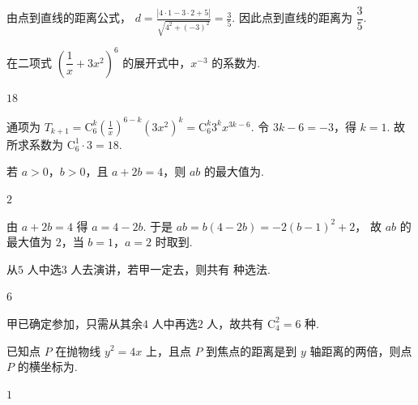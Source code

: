 \begin{solution}
由点到直线的距离公式，
\(d=\frac{|4\cdot1-3\cdot2+5|}{\sqrt{4^2+(-3)^2}}=\frac{3}{5}\).
因此点到直线的距离为 \(\dfrac35\).
\end{solution}

\begin{problem}
在二项式 \(\left(\dfrac1x+3x^2\right)^6\) 的展开式中，\(x^{-3}\) 的系数为\fillinblank{}.
\end{problem}

\begin{answer}
\(18\)
\end{answer}

\begin{solution}
通项为
\(T_{k+1}=\mathrm C_6^k\left(\frac1x\right)^{6-k}(3x^2)^k=\mathrm C_6^k3^kx^{3k-6}\).
令 \(3k-6=-3\)，得 \(k=1\). 故所求系数为 \(\mathrm C_6^1\cdot3=18\).
\end{solution}

\begin{problem}
若 \(a>0\)，\(b>0\)，且 \(a+2b=4\)，则 \(ab\) 的最大值为\fillinblank{}.
\end{problem}

\begin{answer}
\(2\)
\end{answer}

\begin{solution}
由 \(a+2b=4\) 得 \(a=4-2b\). 于是
\(ab=b(4-2b)=-2\left(b-1\right)^2+2\)，
故 \(ab\) 的最大值为 \(2\)，当 \(b=1\)，\(a=2\) 时取到.
\end{solution}

\begin{problem}
从\(5\text{ 人}\)中选\(3\text{ 人}\)去演讲，若甲一定去，则共有\fillinblank{}\(\text{ 种}\)选法.
\end{problem}

\begin{answer}
\(6\)
\end{answer}

\begin{solution}
甲已确定参加，只需从其余\(4\text{ 人}\)中再选\(2\text{ 人}\)，故共有 \(\mathrm C_4^2=6\text{ 种}\).
\end{solution}

\begin{problem}
已知点 \(P\) 在抛物线 \(y^2=4x\) 上，且点 \(P\) 到焦点的距离是到 \(y\) 轴距离的两倍，则点 \(P\) 的横坐标为\fillinblank{}.
\end{problem}

\begin{answer}
\(1\)
\end{answer}

